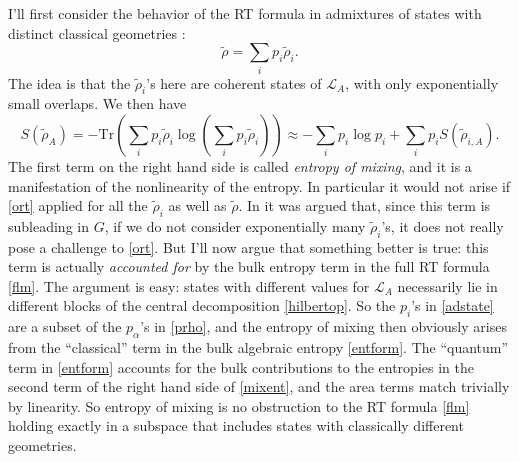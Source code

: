 \documentclass[12pt]{article}
\newcommand{\be}{\begin{equation}}
\newcommand{\ee}{\end{equation}}
\newcommand{\Tr}{\mathrm{Tr}}
\newcommand{\wt}{\widetilde}
\newcommand{\Ll}{\mathcal{L}}
\newcommand{\LA}{\Ll_A}
\begin{document}
I'll first consider the behavior of the RT formula in admixtures of states with distinct classical geometries \cite{Papadodimas:2015jra,Almheiri:2016blp}:
\be\label{adstate}
\wt{\rho}=\sum_i p_i \wt{\rho}_i.
\ee
The idea is that the $\wt{\rho}_i$'s here are coherent states of $\LA$, with only exponentially small overlaps.  We then have
\be\label{mixent}
S(\wt{\rho}_A)=-\Tr\left(\sum_i p_i \wt{\rho}_i\log\left(\sum_i p_i \wt{\rho}_i\right)\right)\approx -\sum_i p_i \log p_i+\sum_i p_i S\left(\wt{\rho}_{i,A}\right).
\ee
The first term on the right hand side is called \textit{entropy of mixing}, and it is a manifestation of the nonlinearity of the entropy.  In particular it would not arise if \eqref{ort} applied for all the $\wt{\rho}_i$ as well as $\wt{\rho}$.  In \cite{Papadodimas:2015jra,Almheiri:2016blp} it was argued that, since this term is subleading in $G$, if we do not consider exponentially many $\wt{\rho}_i$'s, it does not really pose a challenge to \eqref{ort}.  But I'll now argue that something better is true: this term is actually \textit{accounted for} by the bulk entropy term in the full RT formula \eqref{flm}.  The argument is easy: states with different values for $\LA$ necessarily lie in different blocks of the central decomposition \eqref{hilbertop}.  So the $p_i$'s in \eqref{adstate} are a subset of the $p_\alpha$'s in \eqref{prho}, and the entropy of mixing then obviously arises from the ``classical'' term in the bulk algebraic entropy \eqref{entform}.  The ``quantum'' term in \eqref{entform} accounts for the bulk contributions to the entropies in the second term of the right hand side of \eqref{mixent}, and the area terms match trivially by linearity.  So entropy of mixing is no obstruction to the RT formula \eqref{flm} holding exactly in a subspace that includes states with classically different geometries.
\end{document}
